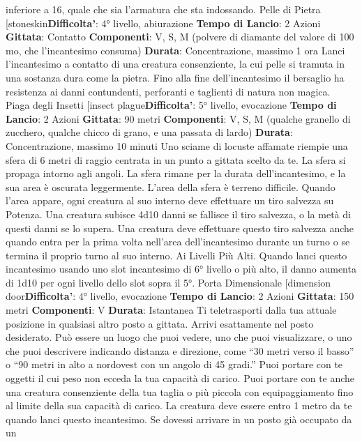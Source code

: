 \begin{multicols}{2}
inferiore a 16, quale che sia l’armatura che sta
indossando.
Pelle di Pietra
[stoneskin\textbf{Difficolta'}:
4° livello, abiurazione
\textbf{Tempo di Lancio}: 2 Azioni
\textbf{Gittata}: Contatto
\textbf{Componenti}: V, S, M (polvere di diamante del valore di
100 mo, che l’incantesimo consuma)
\textbf{Durata}: Concentrazione, massimo 1 ora
Lanci l’incantesimo a contatto di una creatura
consenziente, la cui pelle si tramuta in una sostanza
dura come la pietra. Fino alla fine dell’incantesimo il
bersaglio ha resistenza ai danni contundenti, perforanti
e taglienti di natura non magica.
Piaga degli Insetti
[insect plague\textbf{Difficolta'}:
5° livello, evocazione
\textbf{Tempo di Lancio}: 2 Azioni
\textbf{Gittata}: 90 metri
\textbf{Componenti}: V, S, M (qualche granello di zucchero,
qualche chicco di grano, e una passata di lardo)
\textbf{Durata}: Concentrazione, massimo 10 minuti
Uno sciame di locuste affamate riempie una sfera di 6
metri di raggio centrata in un punto a gittata scelto da
te. La sfera si propaga intorno agli angoli. La sfera
rimane per la durata dell’incantesimo, e la sua area è
oscurata leggermente. L’area della sfera è terreno
difficile.
Quando l’area appare, ogni creatura al suo interno deve
effettuare un tiro salvezza su Potenza. Una
creatura subisce 4d10 danni se fallisce il tiro
salvezza, o la metà di questi danni se lo supera. Una
creatura deve effettuare questo tiro salvezza anche
quando entra per la prima volta nell’area
dell’incantesimo durante un turno o se termina il proprio
turno al suo interno.
Ai Livelli Più Alti. Quando lanci questo incantesimo
usando uno slot incantesimo di 6° livello o più alto, il
danno aumenta di 1d10 per ogni livello dello slot sopra
il 5°.
Porta Dimensionale
[dimension door\textbf{Difficolta'}:
4° livello, evocazione
\textbf{Tempo di Lancio}: 2 Azioni
\textbf{Gittata}: 150 metri
\textbf{Componenti}: V
\textbf{Durata}: Istantanea
Ti teletrasporti dalla tua attuale posizione in qualsiasi
altro posto a gittata. Arrivi esattamente nel posto
desiderato. Può essere un luogo che puoi vedere, uno
che puoi visualizzare, o uno che puoi descrivere
indicando distanza e direzione, come “30 metri verso il
basso” o “90 metri in alto a nordovest con un angolo di
45 gradi.”
Puoi portare con te oggetti il cui peso non ecceda la tua
capacità di carico. Puoi portare con te anche una
creatura consenziente della tua taglia o più piccola con
equipaggiamento fino al limite della sua capacità di
carico. La creatura deve essere entro 1 metro da te
quando lanci questo incantesimo.
Se dovessi arrivare in un posto già occupato da un

\end{multicols}

